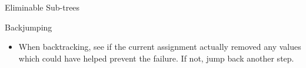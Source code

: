 \documentclass{beamer}
\begin{document}
\begin{frame}{Eliminable Sub-trees}
\begin{center}
    \end{center}

\end{frame}

\begin{frame}{Backjumping}

    \begin{itemize}
        \item When backtracking, see if the current assignment actually removed any values which
            could have helped prevent the failure. If not, jump back another step.
    \end{itemize}

\end{frame}
\end{document}
